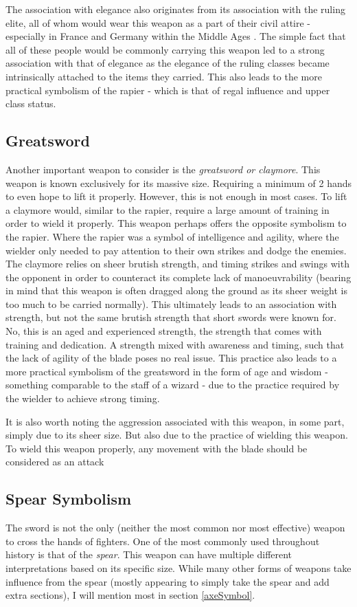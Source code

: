 \documentclass{article}
\begin{document}
The association with elegance also originates from its association with the ruling elite, all of whom would wear this weapon as a part of their civil attire - especially in France and Germany within the Middle Ages \parencite{correa2013history}. The simple fact that all of these people would be commonly carrying this weapon led to a strong association with that of elegance as the elegance of the ruling classes became intrinsically attached to the items they carried. This also leads to the more practical symbolism of the rapier - which is that of regal influence and upper class status.

\subsection*{Greatsword} \label{greatswordSymbol}
Another important weapon to consider is the \emph{greatsword or claymore}. This weapon is known exclusively for its massive size. Requiring a minimum of 2 hands to even hope to lift it properly. However, this is not enough in most cases. To lift a claymore would, similar to the rapier, require a large amount of training in order to wield it properly. This weapon perhaps offers the opposite symbolism to the rapier. Where the rapier was a symbol of intelligence and agility, where the wielder only needed to pay attention to their own strikes and dodge the enemies. The claymore relies on sheer brutish strength, and timing strikes and swings with the opponent in order to counteract its complete lack of manoeuvrability (bearing in mind that this weapon is often dragged along the ground as its sheer weight is too much to be carried normally). This ultimately leads to an association with strength, but not the same brutish strength that short swords were known for. No, this is an aged and experienced strength, the strength that comes with training and dedication. A strength mixed with awareness and timing, such that the lack of agility of the blade poses no real issue. This practice also leads to a more practical symbolism of the greatsword in the form of age and wisdom - something comparable to the staff of a wizard - due to the practice required by the wielder to achieve strong timing.

It is also worth noting the aggression associated with this weapon, in some part, simply due to its sheer size. But also due to the practice of wielding this weapon. To wield this weapon properly, any movement with the blade should be considered as an attack

\subsection{Spear Symbolism} \label{spearSymbol}
The sword is not the only (neither the most common nor most effective) weapon to cross the hands of fighters. One of the most commonly used throughout history is that of the \emph{spear}. This weapon can have multiple different interpretations based on its specific size. While many other forms of weapons take influence from the spear (mostly appearing to simply take the spear and add extra sections), I will mention most in section \ref{axeSymbol}.
\end{document}
